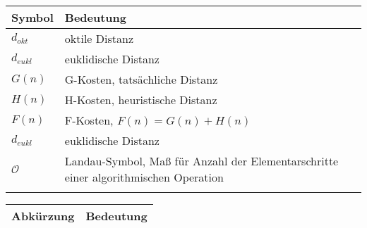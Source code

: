 \begin{longtable}{p{} p{}}
    \hline
    Symbol & Bedeutung\\
    \hline
    \endhead
    $d_{okt}$               & oktile Distanz\\
    $d_{eukl}$              & euklidische Distanz\\
    $G(n)$                  & G-Kosten, tatsächliche Distanz\\
    $H(n)$                  & H-Kosten, heuristische Distanz\\
    $F(n)$                  & F-Kosten, $F(n)=G(n)+H(n)$\\
    $d_{eukl}$              & euklidische Distanz\\
    $\mathcal{O}$           & Landau-Symbol, Maß für Anzahl der Elementarschritte einer algorithmischen Operation\\
    \caption*{}
\end{longtable}

\begin{table}[H]
    \begin{tabular}{ll}
        \hline
        Abkürzung\phantom{123456}& Bedeutung \phantom{1234567891234567891234567891234567899}\\
        \hline
    \end{tabular}
\end{table}
\begin{addmargin}[0.2cm]{0cm}
    \vspace{-0.6cm}
    \begin{acronym}[MMAE~~~~~~~~~~~~]
        \setlength{\itemsep}{-\parsep}
    \end{acronym}
\end{addmargin}